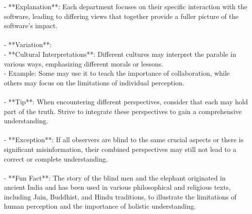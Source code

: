 \documentclass[a4paper,12pt,single,pdftex]{scrbook}
\begin{document}
    
        - **Explanation**: Each department focuses on their specific interaction with the software, leading to differing views that together provide a fuller picture of the software's impact.
    \\

    
      
    \\

    
      - **Variation**:
    \\

    
        - **Cultural Interpretations**: Different cultures may interpret the parable in various ways, emphasizing different morals or lessons.
    \\

    
          - Example: Some may use it to teach the importance of collaboration, while others may focus on the limitations of individual perception.
    \\

    
      
    \\

    
      - **Tip**: When encountering different perspectives, consider that each may hold part of the truth. Strive to integrate these perspectives to gain a comprehensive understanding.
    \\

    
      
    \\

    
      - **Exception**: If all observers are blind to the same crucial aspects or there is significant misinformation, their combined perspectives may still not lead to a correct or complete understanding.
    \\

    
      
    \\

    
      - **Fun Fact**: The story of the blind men and the elephant originated in ancient India and has been used in various philosophical and religious texts, including Jain, Buddhist, and Hindu traditions, to illustrate the limitations of human perception and the importance of holistic understanding.
    \\
\end{document}
